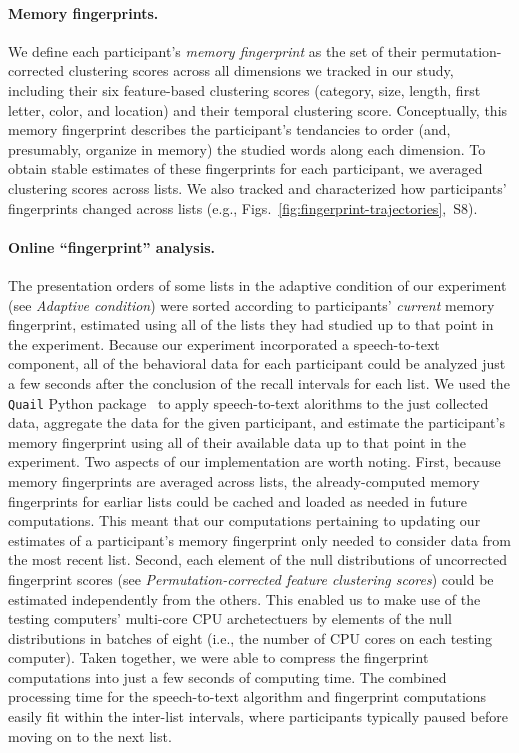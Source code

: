 \documentclass[11pt]{article}
\newcommand{\fingerprintTrajectoryRandom}{S8}
\begin{document}
\paragraph*{Memory fingerprints.}

We define each participant's \textit{memory fingerprint} as the set of their
permutation-corrected clustering scores across all dimensions we tracked in our
study, including their six feature-based clustering scores (category, size,
length, first letter, color, and location) and their temporal clustering score.
Conceptually, this memory fingerprint describes the participant's tendancies to
order (and, presumably, organize in memory) the studied words along each
dimension. To obtain stable estimates of these fingerprints for each
participant, we averaged clustering scores across lists. We also tracked and
characterized how participants' fingerprints changed across lists (e.g.,
Figs.~\ref{fig:fingerprint-trajectories},~\fingerprintTrajectoryRandom).

\paragraph{Online ``fingerprint'' analysis.}

The presentation orders of some lists in the adaptive condition of our
experiment (see \textit{Adaptive condition}) were sorted according to
participants' \textit{current} memory fingerprint, estimated using all of the
lists they had studied up to that point in the experiment. Because our
experiment incorporated a speech-to-text component, all of the behavioral data
for each participant could be analyzed just a few seconds after the conclusion
of the recall intervals for each list. We used the \texttt{Quail} Python
package~\citep{HeusEtal17} to apply speech-to-text alorithms to the just
collected data, aggregate the data for the given participant, and estimate the
participant's memory fingerprint using all of their available data up to that
point in the experiment. Two aspects of our implementation are worth noting.
First, because memory fingerprints are averaged across lists, the
already-computed memory fingerprints for earliar lists could be cached and
loaded as needed in future computations. This meant that our computations
pertaining to updating our estimates of a participant's memory fingerprint only
needed to consider data from the most recent list. Second, each element of the
null distributions of uncorrected fingerprint scores (see
\textit{Permutation-corrected feature clustering scores}) could be estimated
independently from the others. This enabled us to make use of the testing
computers' multi-core CPU archetectuers by elements of the null distributions
in batches of eight (i.e., the number of CPU cores on each testing computer).
Taken together, we were able to compress the fingerprint computations into just
a few seconds of computing time. The combined processing time for the
speech-to-text algorithm and fingerprint computations easily fit within the
inter-list intervals, where participants typically paused before moving on to
the next list.
\end{document}
